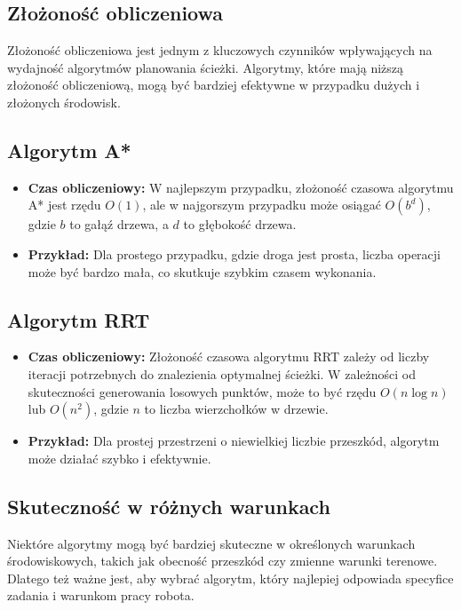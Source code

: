 \documentclass[10pt,a4paper]{article}
\begin{document}
\subsection{Złożoność obliczeniowa}
Złożoność obliczeniowa jest jednym z kluczowych czynników wpływających na wydajność algorytmów planowania ścieżki. Algorytmy, które mają niższą złożoność obliczeniową, mogą być bardziej efektywne w przypadku dużych i złożonych środowisk.

\subsection{Algorytm A*}
\begin{itemize}
    \item \textbf{Czas obliczeniowy:} W najlepszym przypadku, złożoność czasowa algorytmu A* jest rzędu \(O(1)\), ale w najgorszym przypadku może osiągać \(O(b^d)\), gdzie \(b\) to gałąź drzewa, a \(d\) to głębokość drzewa.
    \item \textbf{Przykład:} Dla prostego przypadku, gdzie droga jest prosta, liczba operacji może być bardzo mała, co skutkuje szybkim czasem wykonania.
\end{itemize}

\subsection{Algorytm RRT}
\begin{itemize}
    \item \textbf{Czas obliczeniowy:} Złożoność czasowa algorytmu RRT zależy od liczby iteracji potrzebnych do znalezienia optymalnej ścieżki. W zależności od skuteczności generowania losowych punktów, może to być rzędu \(O(n \log n)\) lub \(O(n^2)\), gdzie \(n\) to liczba wierzchołków w drzewie.
    \item \textbf{Przykład:} Dla prostej przestrzeni o niewielkiej liczbie przeszkód, algorytm może działać szybko i efektywnie.
\end{itemize}

\subsection{Skuteczność w różnych warunkach}
Niektóre algorytmy mogą być bardziej skuteczne w określonych warunkach środowiskowych, takich jak obecność przeszkód czy zmienne warunki terenowe. Dlatego też ważne jest, aby wybrać algorytm, który najlepiej odpowiada specyfice zadania i warunkom pracy robota.
\end{document}
